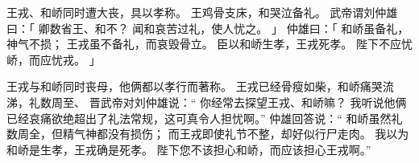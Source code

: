 
\switchcolumn*[\section{}]

王戎、和峤同时遭大丧，具以孝称。
王鸡骨支床，和哭泣备礼。
武帝谓刘仲雄曰：「
    卿数省王、和不？
    闻和哀苦过礼，使人忧之。
」
仲雄曰：「
    和峤虽备礼，神气不损；
    王戎虽不备礼，而哀毁骨立。
    臣以和峤生孝，王戎死孝。
    陛下不应忧峤，而应忧戎。
」

\switchcolumn


王戎与和峤同时丧母，他俩都以孝行而著称。
王戎已经骨瘦如柴，和峤痛哭流涕，礼数周至、
晋武帝对刘仲雄说：“
 你经常去探望王戎、和峤嘛？
 我听说他俩已经哀痛欲绝超出了礼法常规，这可真令人担忧啊。”
仲雄回答说：“
 和峤虽然礼数周全，但精气神都没有损伤；
 而王戎即使礼节不整，却好似行尸走肉。
 我以为和峤是生孝，王戎确是死孝。
 陛下您不该担心和峤，而应该担心王戎啊。”
